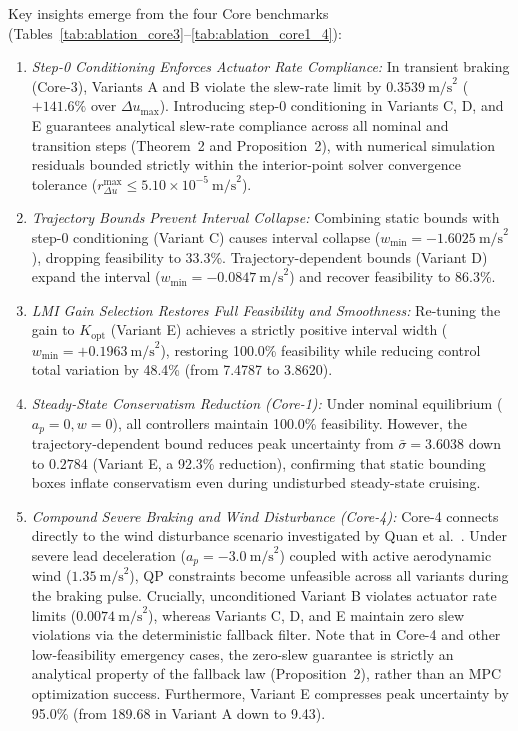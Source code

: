 \documentclass[journal]{IEEEtran}
\begin{document}
Key insights emerge from the four Core benchmarks (Tables~\ref{tab:ablation_core3}--\ref{tab:ablation_core1_4}):
\begin{enumerate}
    \item \emph{Step-0 Conditioning Enforces Actuator Rate Compliance:} In transient braking (Core-3), Variants A and B violate the slew-rate limit by $0.3539~\text{m/s}^2$ ($+141.6\%$ over $\Delta u_{\max}$). Introducing step-0 conditioning in Variants C, D, and E guarantees analytical slew-rate compliance across all nominal and transition steps (Theorem~2 and Proposition~2), with numerical simulation residuals bounded strictly within the interior-point solver convergence tolerance ($r_{\Delta u}^{\max} \le 5.10 \times 10^{-5}~\text{m/s}^2$).
    \item \emph{Trajectory Bounds Prevent Interval Collapse:} Combining static bounds with step-0 conditioning (Variant C) causes interval collapse ($w_{\min} = -1.6025~\text{m/s}^2$), dropping feasibility to 33.3\%. Trajectory-dependent bounds (Variant D) expand the interval ($w_{\min} = -0.0847~\text{m/s}^2$) and recover feasibility to 86.3\%.
    \item \emph{LMI Gain Selection Restores Full Feasibility and Smoothness:} Re-tuning the gain to $K_{\mathrm{opt}}$ (Variant E) achieves a strictly positive interval width ($w_{\min} = +0.1963~\text{m/s}^2$), restoring 100.0\% feasibility while reducing control total variation by 48.4\% (from 7.4787 to 3.8620).
    \item \emph{Steady-State Conservatism Reduction (Core-1):} Under nominal equilibrium ($a_p = 0, w = 0$), all controllers maintain 100.0\% feasibility. However, the trajectory-dependent bound reduces peak uncertainty from $\bar\sigma = 3.6038$ down to $0.2784$ (Variant E, a 92.3\% reduction), confirming that static bounding boxes inflate conservatism even during undisturbed steady-state cruising.
    \item \emph{Compound Severe Braking and Wind Disturbance (Core-4):} Core-4 connects directly to the wind disturbance scenario investigated by Quan et al.~\cite{Quan2024}. Under severe lead deceleration ($a_p = -3.0~\text{m/s}^2$) coupled with active aerodynamic wind ($1.35~\text{m/s}^2$), QP constraints become unfeasible across all variants during the braking pulse. Crucially, unconditioned Variant B violates actuator rate limits ($0.0074~\text{m/s}^2$), whereas Variants C, D, and E maintain zero slew violations via the deterministic fallback filter. Note that in Core-4 and other low-feasibility emergency cases, the zero-slew guarantee is strictly an analytical property of the fallback law (Proposition~2), rather than an MPC optimization success. Furthermore, Variant E compresses peak uncertainty by 95.0\% (from 189.68 in Variant A down to 9.43).

\end{enumerate}
\end{document}
